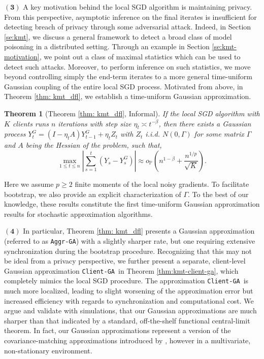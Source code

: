 \documentclass[a4paper,11pt]{article}
\numberwithin{equation}{section}
\theoremstyle{plain}
\newtheorem{theorem}{Theorem}[section]
\theoremstyle{remark}
\newcommand{\IP}{\mathbb{P}}
\newcommand{\ag}{\texttt{Aggr-GA}}
\newcommand{\cg}{\texttt{Client-GA}}
\begin{document}
    \noindent $\mathbf{(3)}$ A key motivation behind the local SGD algorithm is maintaining privacy. From this perspective, asymptotic inference on the final iterates is insufficient for detecting breach of privacy through some adversarial attack. Indeed, in Section \ref{se:kmt}, we discuss a general framework to detect a broad class of model poisoning in a distributed setting. Through an example in Section \ref{se:kmt-motivation}, we point out a class of maximal statistics which can be used to detect such attacks. Moreover, to perform inference on such statistics, we move beyond controlling simply the end-term iterates to a more general time-uniform Gaussian coupling of the entire local SGD process. Motivated from above, in Theorem \ref{thm: kmt_dfl}, we establish a time-uniform Gaussian approximation. 
   \begin{theorem}[Theorem \ref{thm: kmt_dfl}, Informal]
        If the local SGD algorithm with $K$ clients runs $n$ iterations with step size $\eta_t \asymp t^{-\beta}$, then there exists a Gaussian process $Y_t^G = (I-\eta_tA) Y_{t-1}^G + \eta_t Z_t$ with $Z_t$ i.i.d. $N(0,\Gamma)$ for some matrix $\Gamma$ and $A$ being the Hessian of the problem, such that,
    \[  \max_{1\leq t \leq n} |\sum_{s=1}^t (Y_s - Y_s^G)| \approx o_{\IP}(n^{1-\beta} + \frac{n^{1/p}}{\sqrt{K}} ). \]
 \end{theorem}
    Here we assume $p\geq 2$ finite moments of the local noisy gradients. To facilitate bootstrap, we also provide an explicit characterization of $\Gamma$. To the best of our knowledge, these results constitute the first time-uniform Gaussian approximation results for stochastic approximation algorithms.
    
    \noindent $\mathbf{(4)}$ In particular, Theorem \ref{thm: kmt_dfl} presents a Gaussian approximation (referred to as \ag) with a slightly sharper rate, but one requiring extensive synchronization during the bootstrap procedure. Recognizing that this may not be ideal from a privacy perspective, we further present a separate, client-level Gaussian approximation \cg\ in Theorem \ref{thm:kmt-client-ga}, which completely mimics the local SGD procedure. The approximation \cg\ is much more localized, leading to slight worsening of the approximation error but increased efficiency with regards to synchronization and computational cost.
    We argue and validate with simulations, that our Gaussian approximations are much sharper than that indicated by a standard, off-the-shelf functional central-limit theorem. In fact, our Gaussian approximations represent a version of the covariance-matching approximations introduced by \cite{bonnerjee2024aos}, however in a multivariate, non-stationary environment. 
    
\end{document}
